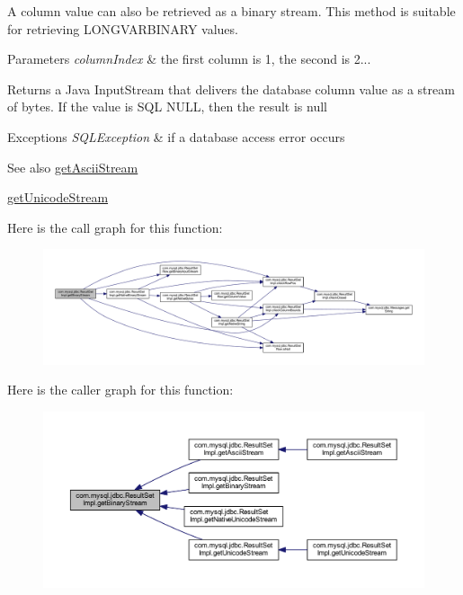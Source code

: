 A column value can also be retrieved as a binary stream. This method is suitable for retrieving L\+O\+N\+G\+V\+A\+R\+B\+I\+N\+A\+RY values.


\begin{DoxyParams}{Parameters}
{\em column\+Index} & the first column is 1, the second is 2...\\
\hline
\end{DoxyParams}
\begin{DoxyReturn}{Returns}
a Java Input\+Stream that delivers the database column value as a stream of bytes. If the value is S\+QL N\+U\+LL, then the result is null
\end{DoxyReturn}

\begin{DoxyExceptions}{Exceptions}
{\em S\+Q\+L\+Exception} & if a database access error occurs\\
\hline
\end{DoxyExceptions}
\begin{DoxySeeAlso}{See also}
\mbox{\hyperlink{classcom_1_1mysql_1_1jdbc_1_1_result_set_impl_a3121b8b483b8b8bfcdf6b1b977a60808}{get\+Ascii\+Stream}} 

\mbox{\hyperlink{classcom_1_1mysql_1_1jdbc_1_1_result_set_impl_ae1fb89a978f6a70882bb7305f8266234}{get\+Unicode\+Stream}} 
\end{DoxySeeAlso}
Here is the call graph for this function\+:
\nopagebreak
\begin{figure}[H]
\begin{center}
\leavevmode
\includegraphics[width=350pt]{classcom_1_1mysql_1_1jdbc_1_1_result_set_impl_a59faa6b2172c9dafdc26ea397bc4fc93_cgraph}
\end{center}
\end{figure}
Here is the caller graph for this function\+:
\nopagebreak
\begin{figure}[H]
\begin{center}
\leavevmode
\includegraphics[width=350pt]{classcom_1_1mysql_1_1jdbc_1_1_result_set_impl_a59faa6b2172c9dafdc26ea397bc4fc93_icgraph}
\end{center}
\end{figure}
